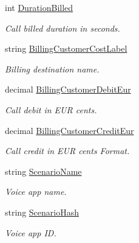 \begin{DoxyCompactItemize}
int \hyperlink{class_thecallr_api_1_1_objects_1_1_cdr_1_1_cdr_a289efda31c58ea9d18f5710486bd67f5}{Duration\+Billed}
\begin{DoxyCompactList}\small\item\em Call billed duration in seconds. \end{DoxyCompactList}\item 
string \hyperlink{class_thecallr_api_1_1_objects_1_1_cdr_1_1_cdr_a92ae341a1305c1d65c441342ec766eb5}{Billing\+Customer\+Cost\+Label}
\begin{DoxyCompactList}\small\item\em Billing destination name. \end{DoxyCompactList}\item 
decimal \hyperlink{class_thecallr_api_1_1_objects_1_1_cdr_1_1_cdr_a28797a072690e3cfb74df18d75e3df13}{Billing\+Customer\+Debit\+Eur}
\begin{DoxyCompactList}\small\item\em Call debit in E\+U\+R cents. \end{DoxyCompactList}\item 
decimal \hyperlink{class_thecallr_api_1_1_objects_1_1_cdr_1_1_cdr_a29dc8be3313a08b1688ae89dc00f1960}{Billing\+Customer\+Credit\+Eur}
\begin{DoxyCompactList}\small\item\em Call credit in E\+U\+R cents Format. \end{DoxyCompactList}\item 
string \hyperlink{class_thecallr_api_1_1_objects_1_1_cdr_1_1_cdr_a0d4841f02ac250c0da0a3e724b3e3aec}{Scenario\+Name}
\begin{DoxyCompactList}\small\item\em Voice app name. \end{DoxyCompactList}\item 
string \hyperlink{class_thecallr_api_1_1_objects_1_1_cdr_1_1_cdr_a31530558154022c2b05e71e521b8ff13}{Scenario\+Hash}
\begin{DoxyCompactList}\small\item\em Voice app I\+D. \end{DoxyCompactList}\item 

\end{DoxyCompactItemize}
